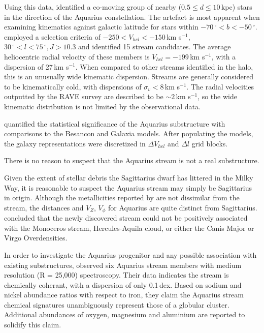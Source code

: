\documentclass{emulateapj}
\begin{document}
Using this data, \citet{Williams;et-al_2011} identified a co-moving group of nearby ($0.5 \leq d \leq 10$\,kpc) stars in the direction of the Aquarius constellation. The artefact is most apparent when examining kinematics against galactic latitude for stars within $-70\,^\circ < b < -50\,^\circ$. \citet{Williams;et-al_2011} employed a selection criteria of $-250 < V_{hel} < -150$\,km s$^{-1}$, $30\,^\circ < l < 75\,^\circ, J > 10.3$ and identified 15 stream candidates. The average heliocentric radial velocity of these members is $V_{hel} = -199$\,km s$^{-1}$, with a dispersion of 27\,km s$^{-1}$. When compared to other streams identified in the halo, this is an unusually wide kinematic dispersion. Streams are generally considered to be kinematically cold, with dispersions of $\sigma_v < 8$\,km s$^{-1}$. The radial velocities outputted by the RAVE survey are described to be $\sim{}2$\,km s$^{-1}$, so the wide kinematic distribution is not limited by the observational data.

\citet{Williams;et-al_2011} quantified the statistical significance of the Aquarius substructure with comparisons to the Besancon and Galaxia models. After populating the models, the galaxy representations were discretized in $\Delta{}V_{hel}$ and $\Delta{}l$ grid blocks. 

There is no reason to suspect that the Aquarius stream is not a real substructure.

Given the extent of stellar debris the Sagittarius dwarf has littered in the Milky Way, it is reasonable to suspect the Aquarius stream may simply be Sagittarius in origin. Although the metallicities reported by \citet{Williams;et-al_2011} are not dissimilar from the stream, the distances and $V_{Z}$, $V_\phi$ for Aquarius are quite distinct from Sagittarius. \citet{Williams;et-al_2011} concluded that the newly discovered stream could not be positively associated with the Monoceros stream, Hercules-Aquila cloud, or either the Canis Major or Virgo Overdensities.

In order to investigate the Aquarius progenitor and any possible association with existing substructures, \citet{Wylie-de_boer;et-al_2012} observed six Aquarius stream members with medium resolution (R = 25,000) spectroscopy. Their data indicates the stream is chemically coherant, with a dispersion of only 0.1\,dex. Based on sodium and nickel abundance ratios with respect to iron, they claim the Aquarius stream chemical signatures unambiguously represent those of a globular cluster. Additional abundances of oxygen, magnesium and aluminium are reported to solidify this claim.
\end{document}
